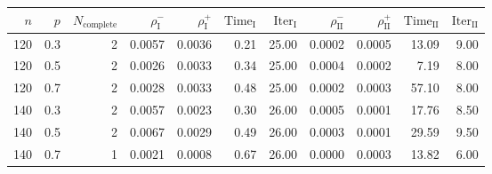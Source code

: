 \begin{tabular}{rrr rrrrrrrr}
\toprule
$n$ & $p$ & $N_{\mathrm{complete}}$ & $\rho^-_{\mathrm I}$ & $\rho^+_{\mathrm I}$ & $\mathrm{Time}_{\mathrm I}$ & $\mathrm{Iter}_{\mathrm I}$ & $\rho^-_{\mathrm{II}}$ & $\rho^+_{\mathrm{II}}$ & $\mathrm{Time}_{\mathrm{II}}$ & $\mathrm{Iter}_{\mathrm{II}}$ \\
\midrule
120 & 0.3 & 2 & 0.0057 & 0.0036 & 0.21 & 25.00 & 0.0002 & 0.0005 & 13.09 & 9.00 \\
120 & 0.5 & 2 & 0.0026 & 0.0033 & 0.34 & 25.00 & 0.0004 & 0.0002 & 7.19 & 8.00 \\
120 & 0.7 & 2 & 0.0028 & 0.0033 & 0.48 & 25.00 & 0.0002 & 0.0003 & 57.10 & 8.00 \\
140 & 0.3 & 2 & 0.0057 & 0.0023 & 0.30 & 26.00 & 0.0005 & 0.0001 & 17.76 & 8.50 \\
140 & 0.5 & 2 & 0.0067 & 0.0029 & 0.49 & 26.00 & 0.0003 & 0.0001 & 29.59 & 9.50 \\
140 & 0.7 & 1 & 0.0021 & 0.0008 & 0.67 & 26.00 & 0.0000 & 0.0003 & 13.82 & 6.00 \\
\bottomrule
\end{tabular}
